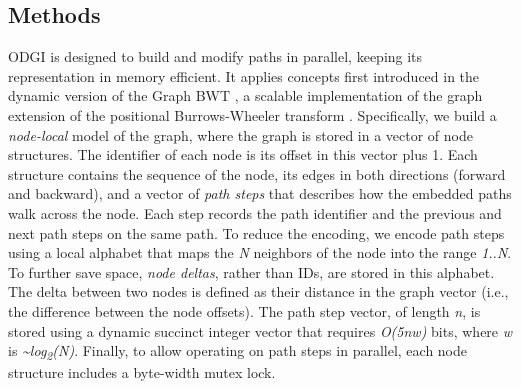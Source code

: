 \documentclass{bioinfo}
\begin{document}
    \begin{methods}
        \section{Methods}

        ODGI is designed to build and modify paths in parallel, keeping its representation in memory efficient. It
        applies concepts first introduced in the dynamic version of the Graph BWT \citep{31406990}, a scalable
        implementation of the graph extension of the positional Burrows-Wheeler transform \citep{28702075}. Specifically,
        we build a \textit{node-local} model of the graph, where the graph is stored in a vector of node structures.
        The identifier of each node is its offset in this vector plus 1. Each structure contains the sequence of the
        node, its edges in both directions (forward and backward), and a vector of \textit{path steps} that describes
        how the embedded paths walk across the node. Each step records the path identifier and the previous and next
        path steps on the same path. To reduce the encoding, we encode path steps using a local alphabet that maps the
        \textit{N} neighbors of the node into the range \textit{1..N}. To further save space, \textit{node deltas},
        rather than IDs, are stored in this alphabet. The delta between two nodes is defined as their distance in the
        graph vector (i.e., the difference between the node offsets). The path step vector, of length \textit{n}, is
        stored using a dynamic succinct integer vector that requires \textit{O(5nw)} bits, where \textit{w} is
        \textit{\textasciitilde log\textsubscript{2}(N)}. Finally, to allow operating on path steps in parallel, each node structure includes a
        byte-width mutex lock.


\end{methods}
\end{document}

